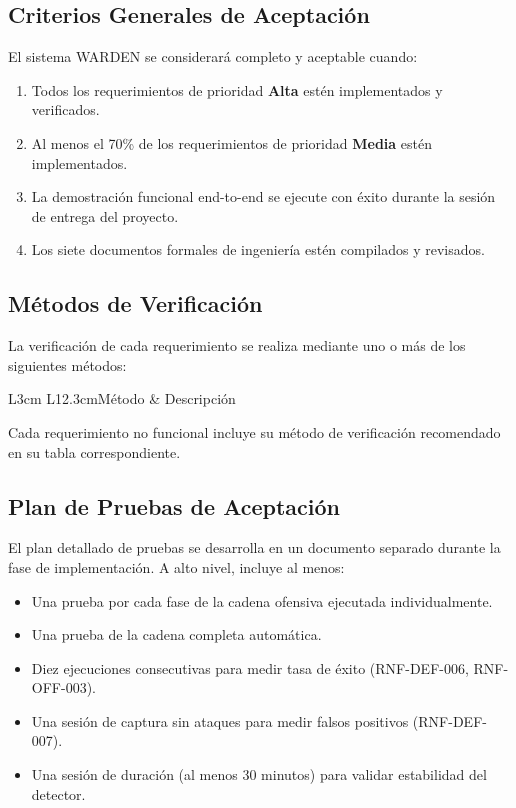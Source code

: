 \documentclass[11pt,a4paper]{article}
\begin{document}
\subsection{Criterios Generales de Aceptación}
El sistema WARDEN se considerará completo y aceptable cuando:

\begin{enumerate}
  \item Todos los requerimientos de prioridad \textbf{Alta} estén
    implementados y verificados.
  \item Al menos el 70\% de los requerimientos de prioridad \textbf{Media}
    estén implementados.
  \item La demostración funcional end-to-end se ejecute con éxito durante
    la sesión de entrega del proyecto.
  \item Los siete documentos formales de ingeniería estén compilados y
    revisados.
\end{enumerate}

\subsection{Métodos de Verificación}
La verificación de cada requerimiento se realiza mediante uno o más de
los siguientes métodos:

\begin{datatable}{L{3cm} L{12.3cm}}{Método & Descripción}
\end{datatable}

Cada requerimiento no funcional incluye su método de verificación
recomendado en su tabla correspondiente.

\subsection{Plan de Pruebas de Aceptación}
El plan detallado de pruebas se desarrolla en un documento separado
durante la fase de implementación. A alto nivel, incluye al menos:

\begin{itemize}
  \item Una prueba por cada fase de la cadena ofensiva ejecutada
    individualmente.
  \item Una prueba de la cadena completa automática.
  \item Diez ejecuciones consecutivas para medir tasa de éxito (RNF-DEF-006,
    RNF-OFF-003).
  \item Una sesión de captura sin ataques para medir falsos positivos
    (RNF-DEF-007).
  \item Una sesión de duración (al menos 30 minutos) para validar
    estabilidad del detector.
\end{itemize}
\end{document}
